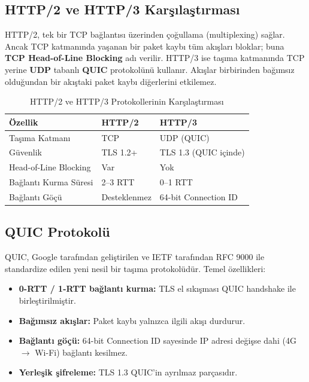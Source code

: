 \documentclass[12pt,a4paper]{article}
\begin{document}
\subsection{HTTP/2 ve HTTP/3 Karşılaştırması}
HTTP/2, tek bir TCP bağlantısı üzerinden çoğullama (multiplexing) sağlar.
Ancak TCP katmanında yaşanan bir paket kaybı tüm akışları bloklar; buna
\textbf{TCP Head-of-Line Blocking} adı verilir. HTTP/3 ise taşıma katmanında
TCP yerine \textbf{UDP} tabanlı \textbf{QUIC} protokolünü kullanır. Akışlar
birbirinden bağımsız olduğundan bir akıştaki paket kaybı diğerlerini
etkilemez.
\begin{table}[H]
  \centering
  \caption{HTTP/2 ve HTTP/3 Protokollerinin Karşılaştırması}
  \begin{tabular}{lll}
    \toprule
    \textbf{Özellik}          & \textbf{HTTP/2}      & \textbf{HTTP/3}       \\
    \midrule
    Taşıma Katmanı            & TCP                  & UDP (QUIC)            \\
    Güvenlik                  & TLS 1.2+             & TLS 1.3 (QUIC içinde) \\
    Head-of-Line Blocking     & Var                  & Yok                   \\
    Bağlantı Kurma Süresi     & 2--3 RTT             & 0--1 RTT              \\
    Bağlantı Göçü             & Desteklenmez         & 64-bit Connection ID  \\
    \bottomrule
  \end{tabular}
\end{table}
\subsection{QUIC Protokolü}
QUIC, Google tarafından geliştirilen ve IETF tarafından RFC 9000 ile
standardize edilen yeni nesil bir taşıma protokolüdür. Temel özellikleri:
\begin{itemize}[leftmargin=1.5em]
  \item \textbf{0-RTT / 1-RTT bağlantı kurma:} TLS el sıkışması QUIC
        handshake ile birleştirilmiştir.
  \item \textbf{Bağımsız akışlar:} Paket kaybı yalnızca ilgili akışı
        durdurur.
  \item \textbf{Bağlantı göçü:} 64-bit Connection ID sayesinde IP adresi
        değişse dahi (4G $\rightarrow$ Wi-Fi) bağlantı kesilmez.
  \item \textbf{Yerleşik şifreleme:} TLS 1.3 QUIC'in ayrılmaz parçasıdır.
\end{itemize}
\end{document}
